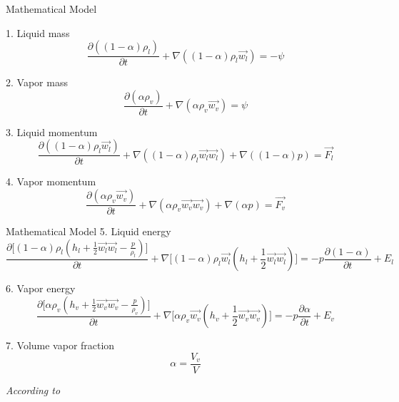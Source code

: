 \ifPresentation
\begin{frame}[t]{Mathematical Model}
    \spc
    \justifying
    \small
    
1. Liquid mass
\begin{equation} \label{eq:athlet-1}
\frac{\partial ((1-\alpha)\rho_{l})}{\partial t} + \nabla ((1-\alpha) \rho_{l} \vec{w_{l}}) = - \psi
\end{equation}


2. Vapor mass
\begin{equation} \label{eq:athlet-2}
\frac{\partial (\alpha \rho_{v})}{\partial t} + \nabla (\alpha \rho_{v} \vec{w_{v}}) = \psi
\end{equation}


3. Liquid momentum
\begin{equation} \label{eq:athlet-3}
\frac{\partial ((1-\alpha) \rho_{l} \vec{w_{l}})}{\partial t} + \nabla ((1-\alpha) \rho_{l} \vec{w_{l}} \vec{w_{l}}) + \nabla ((1 - \alpha)p) = \vec{F_{l}}
\end{equation}

4. Vapor momentum
\begin{equation} \label{eq:athlet-4}
\frac{\partial (\alpha \rho_{v} \vec{w_{v}})}{\partial t} + \nabla (\alpha \rho_{v} \vec{w_{v}} \vec{w_{v}}) + \nabla (\alpha p) = \vec{F_{v}}
\end{equation}

    \normalsize
\end{frame}


\begin{frame}[t]{Mathematical Model}
    \spc
    \justifying
    \small
5. Liquid energy
\begin{equation} \label{eq:athlet-5}
\frac{\partial \Big[ (1-\alpha)\rho_{l}(h_{l} + \frac{1}{2} \vec{w_{l}} \vec{w_{l}} - \frac{p}{\rho_{l}}) \Big]}{\partial t} + \nabla \Big[ (1-\alpha)\rho_{l}\vec{w_{l}}(h_{l} + \frac{1}{2} \vec{w_{l}} \vec{w_{l}}) \Big] = - p \frac{\partial (1 - \alpha)}{\partial t} + E_{l}
\end{equation}


6. Vapor energy
\begin{equation} \label{eq:athlet-6}
\frac{\partial \Big[ \alpha \rho_{v}(h_{v} + \frac{1}{2} \vec{w_{v}} \vec{w_{v}} - \frac{p}{\rho_{v}}) \Big]}{\partial t} + \nabla \Big[ \alpha\rho_{v}\vec{w_{v}}(h_{v} + \frac{1}{2} \vec{w_{v}} \vec{w_{v}}) \Big] = - p \frac{\partial \alpha}{\partial t} + E_{v}
\end{equation}

7. Volume vapor fraction
\begin{equation} \label{eq:athlet-7}
	\alpha = \frac{V_{v}}{V}
\end{equation}

    \normalsize
    \spc
    \textit{According to \cite{lt:ATHLMaM}}\\
\end{frame}


